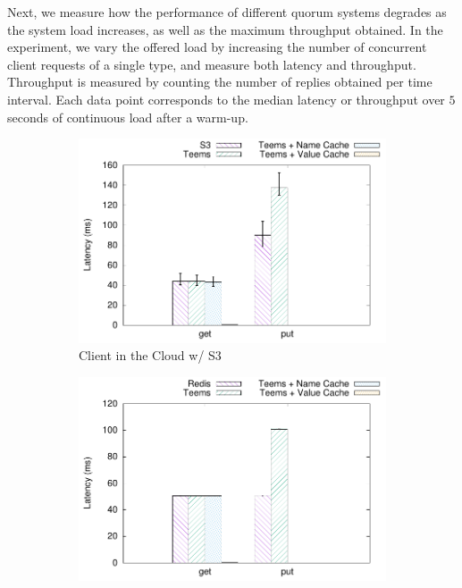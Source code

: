 Next, we measure how the performance of different quorum systems
degrades as the system load increases, as well as the maximum
throughput obtained. In the experiment, we vary the offered load by
increasing the number of concurrent client requests of a single type,
and measure both latency and throughput.  Throughput is measured by
counting the number of replies obtained per time interval.  Each
data point corresponds to the median latency or throughput over $5$
seconds of continuous load after a warm-up.
%

\begin{figure}[t]
    \centering
    \begin{subfigure}[t]{0.24 * 10cm}
        \centering
        \includegraphics[width=\linewidth]{teem_results/deployment/result/client_cloud_s3}
        \caption{Client in the Cloud w/ S3}\label{fig:cloud_client_s3}
    \end{subfigure}
    \begin{subfigure}[t]{0.24 * 10cm}
        \centering
        \includegraphics[width=\linewidth]{teem_results/deployment/result/client_cloud_redis}

\end{subfigure}
\end{figure}
